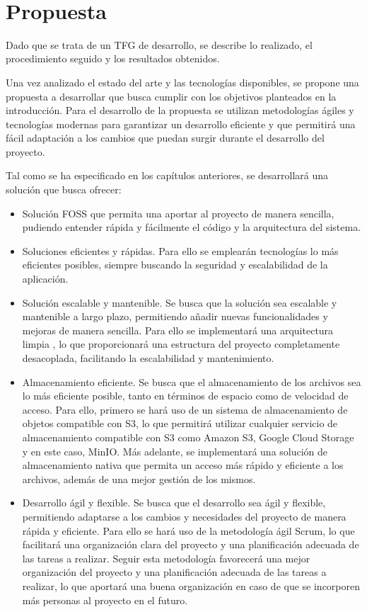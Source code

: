 \newpage
~
\newpage
\section{Propuesta}
Dado que se trata de un TFG de desarrollo, se describe lo realizado, el procedimiento seguido y los resultados obtenidos.

Una vez analizado el estado del arte y las tecnologías disponibles, se propone una propuesta a desarrollar que busca cumplir con los objetivos planteados en la introducción. Para el desarrollo de la propuesta se utilizan metodologías ágiles y tecnologías modernas para garantizar un desarrollo eficiente y que permitirá una fácil adaptación a los cambios que puedan surgir durante el desarrollo del proyecto.

Tal como se ha especificado en los capítulos anteriores, se desarrollará una solución que busca ofrecer:
\begin{itemize}
    \item Solución FOSS que permita una aportar al proyecto de manera sencilla, pudiendo entender rápida y fácilmente el código y la arquitectura del sistema.
    \item Soluciones eficientes y rápidas. Para ello se emplearán tecnologías lo más eficientes posibles, siempre buscando la seguridad y escalabilidad de la aplicación.
    \item Solución escalable y mantenible. Se busca que la solución sea escalable y mantenible a largo plazo, permitiendo añadir nuevas funcionalidades y mejoras de manera sencilla. Para ello se implementará una arquitectura limpia \parencite{uncle-bob-clean-architecture}, lo que proporcionará una estructura del proyecto completamente desacoplada, facilitando la escalabilidad y mantenimiento.
    \item Almacenamiento eficiente. Se busca que el almacenamiento de los archivos sea lo más eficiente posible, tanto en términos de espacio como de velocidad de acceso.
        Para ello, primero se hará uso de un sistema de almacenamiento de objetos compatible con S3, lo que permitirá utilizar cualquier servicio de almacenamiento compatible con S3 como Amazon S3, Google Cloud Storage y en este caso, MinIO.
        Más adelante, se implementará una solución de almacenamiento nativa que permita un acceso más rápido y eficiente a los archivos, además de una mejor gestión de los mismos.
    \item Desarrollo ágil y flexible. Se busca que el desarrollo sea ágil y flexible, permitiendo adaptarse a los cambios y necesidades del proyecto de manera rápida y eficiente. Para ello se hará uso de la metodología ágil Scrum, lo que facilitará una organización clara del proyecto y una planificación adecuada de las tareas a realizar.
        Seguir esta metodología favorecerá una mejor organización del proyecto y una planificación adecuada de las tareas a realizar, lo que aportará una buena organización en caso de que se incorporen más personas al proyecto en el futuro.
\end{itemize}

